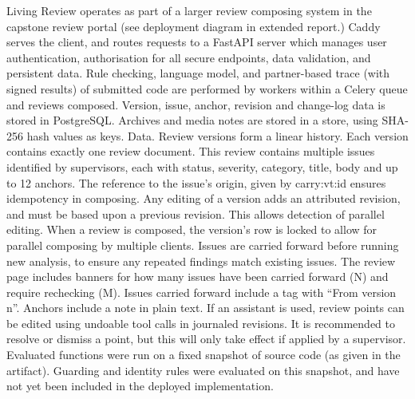 \documentclass[10pt,conference,letterpaper]{IEEEtran}
\begin{document}
Living Review operates as part of a larger review composing system in the capstone review portal (see deployment diagram in extended report.) Caddy serves the client, and routes requests to a FastAPI server which manages user authentication, authorisation for all secure endpoints, data validation, and persistent data. Rule checking, language model, and partner-based trace (with signed results) of submitted code are performed by workers within a Celery queue and reviews composed. Version, issue, anchor, revision and change-log data is stored in PostgreSQL. Archives and media notes are stored in a store, using SHA-256 hash values as keys. Data. Review versions form a linear history. Each version contains exactly one review document. This review contains multiple issues identified by supervisors, each with status, severity, category, title, body and up to 12 anchors. The reference to the issue’s origin, given by carry:vt:id ensures idempotency in composing. Any editing of a version adds an attributed revision, and must be based upon a previous revision. This allows detection of parallel editing. When a review is composed, the version’s row is locked to allow for parallel composing by multiple clients. Issues are carried forward before running new analysis, to ensure any repeated findings match existing issues. The review page includes banners for how many issues have been carried forward (N) and require rechecking (M). Issues carried forward include a tag with “From version n”. Anchors include a note in plain text. If an assistant is used, review points can be edited using undoable tool calls in journaled revisions. It is recommended to resolve or dismiss a point, but this will only take effect if applied by a supervisor. Evaluated functions were run on a fixed snapshot of source code (as given in the artifact). Guarding and identity rules were evaluated on this snapshot, and have not yet been included in the deployed implementation.
\end{document}
